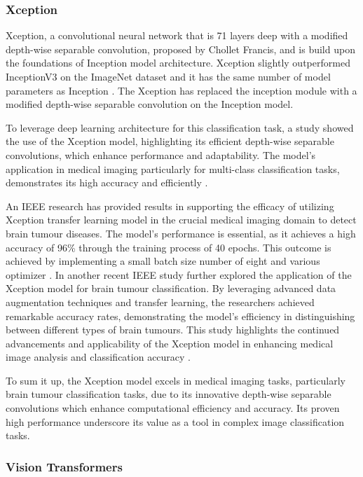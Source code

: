 \subsubsection{Xception}
Xception, a convolutional neural network that is 71 layers deep with a modified depth-wise separable convolution, proposed by Chollet Francis, and is build upon the foundations of Inception model architecture. Xception slightly outperformed InceptionV3 on the ImageNet dataset and it has the same number of model parameters as Inception \cite{Francois_Chollet}. The Xception has replaced the inception module with a modified depth-wise separable convolution on the Inception model.

To leverage deep learning architecture for this classification task, a study showed the use of the Xception model, highlighting its efficient depth-wise separable convolutions, which enhance performance and adaptability. The model's application in medical imaging particularly for multi-class classification tasks, demonstrates its high accuracy and efficiently \cite{li2024leveraging}.

An IEEE research has provided results in supporting the efficacy of utilizing Xception transfer learning model in the crucial medical imaging domain to detect brain tumour diseases. The model's performance is essential, as it achieves a high accuracy of 96\% through the training process of 40 epochs. This outcome is achieved by implementing a small batch size number of eight and various optimizer \cite{10511504}. In another recent IEEE study further explored the application of the Xception model for brain tumour classification. By leveraging advanced data augmentation techniques and transfer learning, the researchers achieved remarkable accuracy rates, demonstrating the model's efficiency in distinguishing between different types of brain tumours. This study highlights the continued advancements and applicability of the Xception model in enhancing medical image analysis and classification accuracy \cite{10331713}.

To sum it up, the Xception model excels in medical imaging tasks, particularly brain tumour classification tasks, due to its innovative depth-wise separable convolutions which enhance computational efficiency and accuracy. Its proven high performance underscore its value as a tool in complex image classification tasks.

\subsubsection{Vision Transformers}


